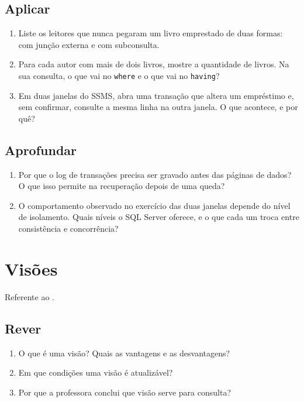 \subsection*{Aplicar}
\begin{enumerate}
	\item Liste os leitores que nunca pegaram um livro emprestado de duas
	formas: com junção externa e com subconsulta.
	\item Para cada autor com mais de dois livros, mostre a quantidade de
	livros. Na sua consulta, o que vai no \texttt{where} e o que vai no
	\texttt{having}?
	\item Em duas janelas do SSMS, abra uma transação que altera um
	empréstimo e, sem confirmar, consulte a mesma linha na outra janela.
	O que acontece, e por quê?
\end{enumerate}

\subsection*{Aprofundar}
\begin{enumerate}
	\item Por que o log de transações precisa ser gravado antes das
	páginas de dados? O que isso permite na recuperação depois de uma
	queda?
	\item O comportamento observado no exercício das duas janelas depende
	do nível de isolamento. Quais níveis o SQL Server oferece, e o que
	cada um troca entre consistência e concorrência?
\end{enumerate}

\section{Visões}

Referente ao .

\subsection*{Rever}
\begin{enumerate}
	\item O que é uma visão? Quais as vantagens e as desvantagens?
	\item Em que condições uma visão é atualizável?
	\item Por que a professora conclui que visão serve para consulta?
\end{enumerate}

